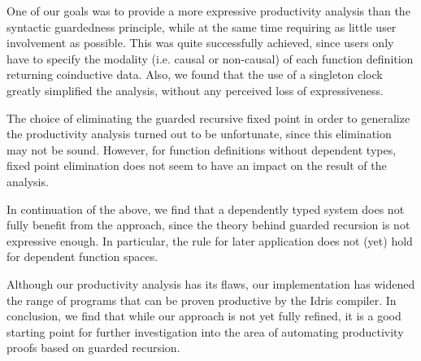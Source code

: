 One of our goals was to provide a more expressive productivity
analysis than the syntactic guardedness principle, while at the same time
requiring as little user involvement as possible. This was quite successfully
achieved, since users only have to specify the modality (i.e. causal or
non-causal) of each function definition returning coinductive data. Also, we
found that the use of a singleton clock greatly simplified the analysis, without
any perceived loss of expressiveness. 

The choice of eliminating the guarded
recursive fixed point in order to generalize the productivity analysis turned
out to be unfortunate, since this elimination may not be sound. However, for
function definitions without dependent types, fixed point elimination does not
seem to have an impact on the result of the analysis.

In continuation of the above, we find that a dependently typed system does not
fully benefit from the approach, since the theory behind guarded recursion
is not expressive enough. In particular, the rule for later
application does not (yet) hold for dependent function spaces.

Although our productivity analysis has its flaws, our implementation has widened the range of
programs that can be proven productive by the Idris compiler. In conclusion, we
find that while our approach is not yet fully refined, it is a good starting
point for further investigation into the area of automating productivity proofs
based on guarded recursion.


